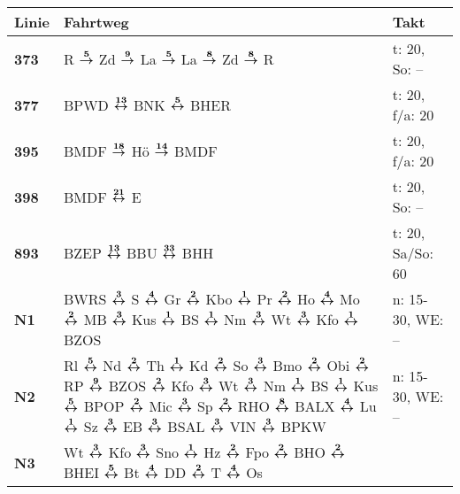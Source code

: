 \begin{minipage}[t]{0.45\textwidth}
\begin{tabular}{>{\bfseries}L{1.2cm}L{9.0cm}L{3.0cm}}
{\bfseries Linie} & {\bfseries Fahrtweg} & {\bfseries Takt} \\
\hline
\bus{} 373    & R $\xarre{5}$ Zd $\xarre{9}$ La $\xarre{5}$ La $\xarre{8}$ Zd $\xarre{8}$ R                                                                                         & t: 20, So: --              \\
\bus{} 377    & BPWD $\xarwe{13}$ BNK $\xarwe{5}$ BHER                                                                                                                              & t: 20, f/a: 20             \\
\bus{} 395    & BMDF $\xarre{18}$ Hö $\xarre{14}$ BMDF                                                                                                                              & t: 20, f/a: 20             \\
\bus{} 398    & BMDF $\xarwe{21}$ E                                                                                                                                                 & t: 20, So: --              \\
\bus{} 893    & BZEP $\xarwe{13}$ BBU $\xarwe{33}$ BHH                                                                                                                              & t: 20, Sa/So: 60           \\
\nbus{} N1    & BWRS $\xarwe{3}$ S $\xarwe{4}$ Gr $\xarwe{2}$ Kbo $\xarwe{1}$ Pr $\xarwe{2}$ Ho $\xarwe{4}$ Mo $\xarwe{2}$ MB $\xarwe{3}$ Kus $\xarwe{1}$ BS $\xarwe{1}$ Nm         %
                $\xarwe{3}$ Wt $\xarwe{3}$ Kfo $\xarwe{1}$ BZOS                                                                                                                     & n: 15-30, WE: --           \\
\nbus{} N2    & Rl $\xarwe{5}$ Nd $\xarwe{2}$ Th $\xarwe{1}$ Kd $\xarwe{2}$ So $\xarwe{3}$ Bmo $\xarwe{2}$ Obi $\xarwe{2}$ RP $\xarwe{9}$ BZOS $\xarwe{2}$ Kfo $\xarwe{3}$ Wt       %
                $\xarwe{3}$ Nm $\xarwe{1}$ BS $\xarwe{1}$ Kus $\xarwe{5}$ BPOP $\xarwe{2}$ Mic $\xarwe{3}$ Sp $\xarwe{2}$ RHO $\xarwe{8}$ BALX $\xarwe{4}$ Lu%
                $\xarwe{1}$ Sz $\xarwe{3}$ EB $\xarwe{3}$ BSAL $\xarwe{3}$ VIN $\xarwe{3}$ BPKW                                                                                     & n: 15-30, WE: --           \\
\nbus{} N3    & Wt $\xarwe{3}$ Kfo $\xarwe{3}$ Sno $\xarwe{1}$ Hz $\xarwe{2}$ Fpo $\xarwe{2}$ BHO $\xarwe{2}$ BHEI $\xarwe{5}$ Bt $\xarwe{4}$ DD $\xarwe{2}$ T $\xarwe{4}$ Os       %

\end{tabular}
\end{minipage}
